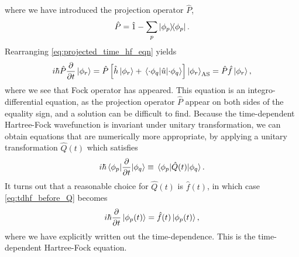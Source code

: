 where we have introduced the projection operator $\hat{P}$, 
\begin{equation}
    \hat{P} = \hat{1} - \sum_p \outerproduct{\phi_p}.
\end{equation}
Rearranging \autoref{eq:projected_time_hf_eqn} yields
\begin{equation}
    \label{eq:tdhf_before_Q}
    i\hbar \hat{P}\frac{\partial}{\partial t} \ket{\phi_r} 
    = \hat{P}\left[\hat{h}\ket{\phi_r} 
        + \mel{\cdot\phi_q}{\hat{u}}{\cdot\phi_q} \right]\ket{\phi_r}_\text{AS}
    = \hat{P}\hat{f}\ket{\phi_r},
\end{equation}
where we see that Fock operator has appeared. This equation is an integro-differential 
equation, as the projection operator $\hat{P}$ appear on both sides of the equality 
sign, and a solution can be difficult to find. Because the time-dependent Hartree-Fock 
wavefunction is invariant under unitary transformation, we can obtain equations that are 
numerically more appropriate, by applying a unitary transformation $\hat{Q}(t)$ which 
satisfies
\begin{equation}
    i\hbar\mel{\phi_p}{\frac{\partial}{\partial t}}{\phi_q}
    \equiv \mel{\phi_p}{\hat{Q}(t)}{\phi_q}.
\end{equation}
It turns out that a reasonable choice for $\hat{Q}(t)$ is $\hat{f}(t)$, in which case 
\autoref{eq:tdhf_before_Q} becomes
\begin{equation}
    \label{eq:tdhf_eqn}
    i\hbar\frac{\partial}{\partial t}\ket{\phi_p(t)} = \hat{f}(t)\ket{\phi_p(t)},
\end{equation}
where we have explicitly written out the time-dependence. This is the time-dependent 
Hartree-Fock equation.

